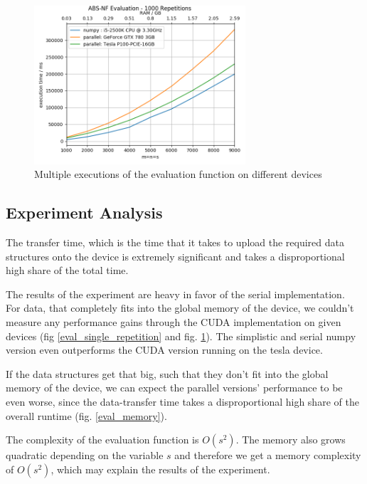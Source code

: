 \begin{figure}[ht]
	\centering
	\includegraphics[width=0.7\textwidth]{img/eval_mult_repetition.png}
	\caption{Multiple executions of the evaluation function on different devices}
	\label{eval_1000}
\end{figure}

\subsection{Experiment Analysis}

The transfer time, which is the time that it takes to upload the required data structures onto the device is extremely significant and takes a disproportional high share of the total time.

The results of the experiment are heavy in favor of the serial implementation.\\
For data, that completely fits into the global memory of the device, we couldn't measure any performance gains through the CUDA implementation on given devices (fig \ref{eval_single_repetition} and  fig. \ref{eval_1000}). The simplistic and serial numpy version even outperforms the CUDA version running on the tesla device.

If the data structures get that big, such that they don't fit into the global memory of the device, we can expect the parallel versions' performance to be even worse, since the data-transfer time takes a disproportional high share of the overall runtime (fig. \ref{eval_memory}).

The complexity of the evaluation function is $O(s^2)$. The memory also grows quadratic depending on the variable $s$ and therefore we get a memory complexity of $O(s^2)$, which may explain the results of the experiment.

